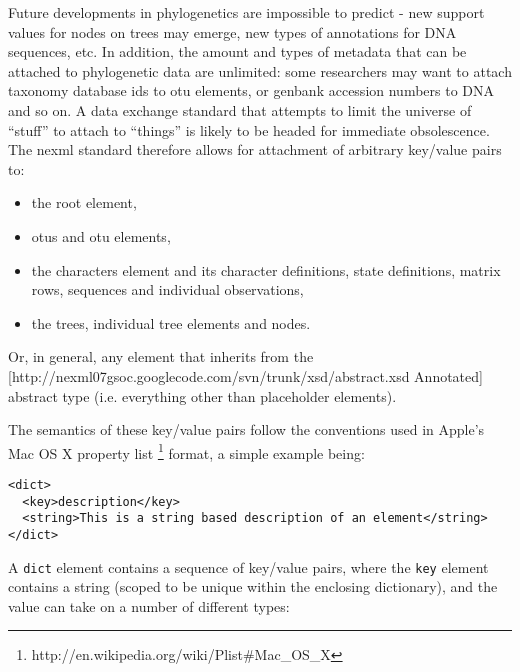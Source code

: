 \documentclass{article}
\newcommand{\code}{\texttt}
\begin{document}
Future developments in phylogenetics are impossible to predict - new support values for nodes on trees may emerge, 
new types of annotations for DNA sequences, etc. In addition, the amount and types of metadata that can be attached to 
phylogenetic data are unlimited: some researchers may want to attach taxonomy database ids to otu elements, or genbank 
accession numbers to DNA and so on. A data exchange standard that attempts to limit the universe of ``stuff'' to attach to 
``things'' is likely to be headed for immediate obsolescence. The nexml standard therefore allows for attachment of arbitrary 
key/value pairs to: 

\begin{itemize}

\item the root element, 

\item otus and otu elements,

\item the characters element and its character definitions, state definitions, matrix rows, sequences and individual 
observations,

\item the trees, individual tree elements and nodes.

\end{itemize}

Or, in general, any element that inherits from the [http://nexml07gsoc.googlecode.com/svn/trunk/xsd/abstract.xsd Annotated] abstract 
type (i.e. everything other than placeholder elements).

The semantics of these key/value pairs follow the conventions used in Apple's Mac OS X property list
\footnote{http://en.wikipedia.org/wiki/Plist\#Mac\_OS\_X} format, a simple example being:
\begin{verbatim}
<dict>
  <key>description</key>
  <string>This is a string based description of an element</string>
</dict>
\end{verbatim}
A \code{dict} element contains a sequence of key/value pairs, where the \code{key} element contains a string 
(scoped to be unique within the enclosing dictionary), and the value can take on a number of different types:
\end{document}
